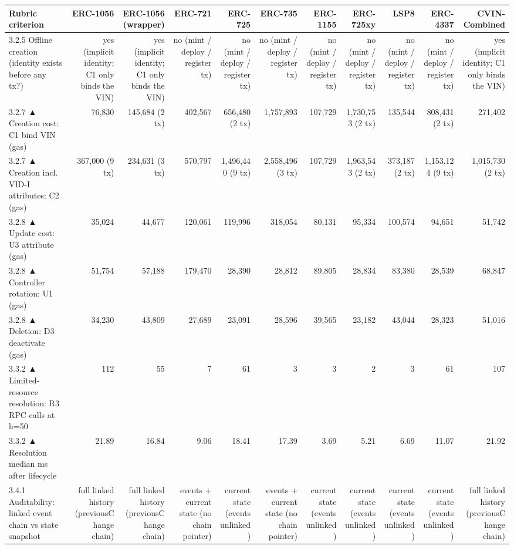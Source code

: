\begin{table}[ht]
\centering
\small
\begin{tabular}{lrrrrrrrrrr}
\toprule
Rubric criterion & ERC-1056 & ERC-1056 (wrapper) & ERC-721 & ERC-725 & ERC-735 & ERC-1155 & ERC-725xy & LSP8 & ERC-4337 & CVIN-Combined \\
\midrule
3.2.5 Offline creation (identity exists before any tx?) & yes (implicit identity; C1 only binds the VIN) & yes (implicit identity; C1 only binds the VIN) & no (mint / deploy / register tx) & no (mint / deploy / register tx) & no (mint / deploy / register tx) & no (mint / deploy / register tx) & no (mint / deploy / register tx) & no (mint / deploy / register tx) & no (mint / deploy / register tx) & yes (implicit identity; C1 only binds the VIN) \\
3.2.7 ▲ Creation cost: C1 bind VIN (gas) & 76,830 & 145,684 (2 tx) & 402,567 & 656,480 (2 tx) & 1,757,893 & 107,729 & 1,730,753 (2 tx) & 135,544 & 808,431 (2 tx) & 271,402 \\
3.2.7 ▲ Creation incl. VID-I attributes: C2 (gas) & 367,000 (9 tx) & 234,631 (3 tx) & 570,797 & 1,496,440 (9 tx) & 2,558,496 (3 tx) & 107,729 & 1,963,543 (2 tx) & 373,187 (2 tx) & 1,153,124 (9 tx) & 1,015,730 (2 tx) \\
3.2.8 ▲ Update cost: U3 attribute (gas) & 35,024 & 44,677 & 120,061 & 119,996 & 318,054 & 80,131 & 95,334 & 100,574 & 94,651 & 51,742 \\
3.2.8 ▲ Controller rotation: U1 (gas) & 51,754 & 57,188 & 179,470 & 28,390 & 28,812 & 89,805 & 28,834 & 83,380 & 28,539 & 68,847 \\
3.2.8 ▲ Deletion: D3 deactivate (gas) & 34,230 & 43,809 & 27,689 & 23,091 & 28,596 & 39,565 & 23,182 & 43,044 & 28,323 & 51,016 \\
3.3.2 ▲ Limited-resource resolution: R3 RPC calls at h=50 & 112 & 55 & 7 & 61 & 3 & 3 & 2 & 3 & 61 & 107 \\
3.3.2 ▲ Resolution median ms after lifecycle & 21.89 & 16.84 & 9.06 & 18.41 & 17.39 & 3.69 & 5.21 & 6.69 & 11.07 & 21.92 \\
3.4.1 Auditability: linked event chain vs state snapshot & full linked history (previousChange chain) & full linked history (previousChange chain) & events + current state (no chain pointer) & current state (events unlinked) & events + current state (no chain pointer) & current state (events unlinked) & current state (events unlinked) & current state (events unlinked) & current state (events unlinked) & full linked history (previousChange chain) \\

\end{tabular}
\end{table}
